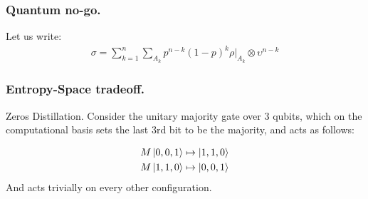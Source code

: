 \documentclass{beamer}
\begin{document}
\begin{frame}
  \frametitle{Quantum no-go.}
Let us write: 
\begin{equation*}
  \begin{split}
    \sigma = \sum^{n}_{k=1}\sum_{A_{k}}p^{n-k}\left( 1 - p  \right)^{k}\rho|_{A_{k}}\otimes \upsilon^{n-k}
  \end{split}
\end{equation*}
\end{frame}

\begin{frame}
  \frametitle{Entropy-Space tradeoff.}

Zeros Distillation. Consider the unitary majority gate over $3$ qubits, which on the computational basis sets the last $3$rd bit to be the majority, and acts as follows:
  
  \begin{equation*}
    \begin{split}
      M \ket{0,0,1} & \mapsto \ket{1,1,0} \\ 
      M \ket{1,1,0} & \mapsto \ket{0,0,1} \\ 
    \end{split}
  \end{equation*} 
And acts trivially on every other configuration.

\end{frame}
\end{document}
